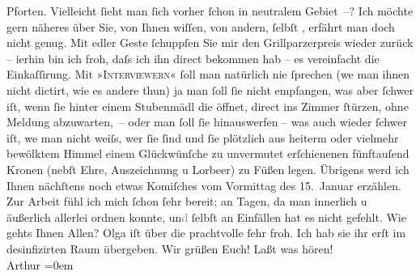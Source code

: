 \begin{ledgroupsized}[t]{13cm}
               Pforten.\pend
           \pstart
           {\pb}Vielleicht ſieht man ſich vorher ſchon in neutralem
               Gebiet –? Ich möchte gern näheres über Sie, von Ihnen wiſſen, von andern, ſelbſt
                  \label{K_L01758-2v}\label{K_L01758-2h},
               erfährt man doch nicht genug.\pend
           \pstart
           Mit edler Geste ſchuppſen Sie mir den Grillparzerpreis wieder zurück – i{\geminationm}erhin bin
               ich froh, daſs ich ihn direct bekommen hab – es vereinfacht die Einkaſſirung. Mit
                  »\textsc{Interviewern}« ſoll man natürlich nie ſprechen (we{\geminationn} man ihnen
               nicht dictirt, wie es andere thun) {\pb}ja man ſoll ſie nicht
               empfangen, was aber ſchwer iſt, wenn ſie hinter einem Stubenmädl die öffnet, direct
               ins Zimmer ſtürzen, ohne Meldung abzuwarten, – oder man ſoll ſie hinauswerfen – was
               auch wieder ſchwer iſt, we{\geminationn} man nicht weiſs, wer ſie
               ſind und ſie plötzlich aus heiterm oder vielmehr bewölktem Himmel einem Glückwünſche
               zu unvermutet erſchienenen fünftauſend Kronen (nebſt Ehre, Auszeichnung u Lorbeer) zu
               Füßen legen. Übrigens werd ich Ihnen {\pb}nächſtens noch
               etwas Komiſches vom Vormittag des 15. Januar erzählen.\pend
           \pstart
           Zur Arbeit fühl ich mich ſchon ſehr bereit; an Tagen, da man innerlich u äußerlich
               allerlei ordnen konnte, un\textcolor{gray}{d} ſelbſt an Einfällen hat es  nicht gefehlt.\pend
           \pstart
           Wie gehts Ihnen Allen? Olga iſt über die
               prachtvolle \label{K_L01758-3v}\label{K_L01758-3h} ſehr froh. Ich hab sie \introOben{}ihr\introOben{}
               erſt im desinfizirten Raum übergeben.\pend
           \pstart
           Wir grüßen Euch! Laßt was hören!{\\[\baselineskip]}\spacefill\mbox{Arthur}\pend
           \leftskip=0em{}
         
         \endnumbering{}\end{ledgroupsized}  \newcommand{\dateiname}{L01758}\newcommand{\titel}{Arthur Schnitzler an Hugo von Hofmannsthal, 25. 1. 1908}\newcommand{\editorInnen}{Martin Anton Müller und Gerd-Hermann Susen}
      
